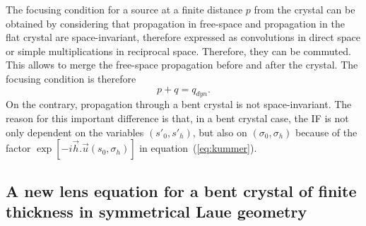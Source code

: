\documentclass[preprint]{iucr}              %
\newcommand{\inred}[1]{{\color{red}#1}}
\begin{document}

\inred{
The focusing condition for a source at a finite distance $p$ from the crystal can be obtained by considering that propagation in free-space and propagation in the flat crystal are space-invariant, therefore expressed as convolutions in direct space or simple multiplications in reciprocal space. Therefore, they can be commuted. This allows to merge the free-space propagation before and after the crystal. The focusing condition is therefore
\begin{equation}
    p + q = q_{dyn}.
\end{equation}
On the contrary, propagation through a bent crystal is not space-invariant. The reason for this important difference is that, in a bent crystal case, the IF is not only dependent on the variables $(s'_0, s'_h)$, but also on $(\sigma_0, \sigma_h)$ because of the factor  
$\exp[-i \vec h . \vec u (s_0, \sigma_h)]$ in 
equation~(\ref{eq:kummer}). 
}


\subsection{\inred{A new} lens equation for a bent crystal of finite thickness in symmetrical Laue geometry}
\label{sec:LaueNewCLE}

\end{document}
